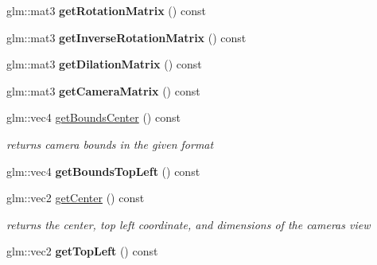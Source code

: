 \begin{DoxyCompactItemize}
\mbox{\label{classnta_1_1Camera2D_ab3fb29b12f0b118dd2be95f701b81e2f}} 
glm\+::mat3 {\bfseries get\+Rotation\+Matrix} () const
\item 
\mbox{\label{classnta_1_1Camera2D_a5b28e343c69aa1f7ded1b8416e556e21}} 
glm\+::mat3 {\bfseries get\+Inverse\+Rotation\+Matrix} () const
\item 
\mbox{\label{classnta_1_1Camera2D_a685dbe2ddad68666132fbf1edec932a6}} 
glm\+::mat3 {\bfseries get\+Dilation\+Matrix} () const
\item 
\mbox{\label{classnta_1_1Camera2D_a203daa81f32279e969de57a549165297}} 
glm\+::mat3 {\bfseries get\+Camera\+Matrix} () const
\item 
\mbox{\label{classnta_1_1Camera2D_ad02d4b9a995f3919c753fd2ea6d9f8f1}} 
glm\+::vec4 \hyperlink{classnta_1_1Camera2D_ad02d4b9a995f3919c753fd2ea6d9f8f1}{get\+Bounds\+Center} () const
\begin{DoxyCompactList}\small\item\em returns camera bounds in the given format \end{DoxyCompactList}\item 
\mbox{\label{classnta_1_1Camera2D_af3b971aa62c8e6ca7287d0d236bb3e3d}} 
glm\+::vec4 {\bfseries get\+Bounds\+Top\+Left} () const
\item 
\mbox{\label{classnta_1_1Camera2D_add5061ade3ed4eb82d3e75f6aba97f70}} 
glm\+::vec2 \hyperlink{classnta_1_1Camera2D_add5061ade3ed4eb82d3e75f6aba97f70}{get\+Center} () const
\begin{DoxyCompactList}\small\item\em returns the center, top left coordinate, and dimensions of the camera\textquotesingle{}s view \end{DoxyCompactList}\item 
\mbox{\label{classnta_1_1Camera2D_adbfd52308be6b9c56736400ac67b65c5}} 
glm\+::vec2 {\bfseries get\+Top\+Left} () const
\item 
\mbox{\label{classnta_1_1Camera2D_a2f688f531a999d2b427ef63a18859e6d}} 

\end{DoxyCompactItemize}
